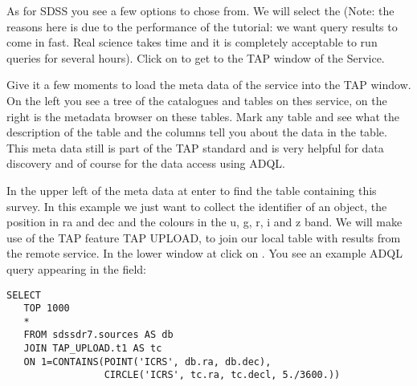 \documentclass[twoside]{article}[12pt]
\begin{document}
As for SDSS you see a few options to chose from. We will select the
 (Note: the reasons here is due to the performance
of the tutorial: we want query results to come in fast. Real science
takes time and it is completely acceptable to run queries for several hours).
Click on  to get to the TAP window of the Service. 

Give it a few moments to load the meta data of the service into the TAP
window. On the left you see a tree of the catalogues and tables on thes
service, on the right is the metadata browser on these tables. Mark any
table and see what the description of the table and the columns tell you
about the data in the table. This meta data still is part of the TAP
standard and is very helpful for data discovery and of course for the
data access using ADQL. 

In the upper left of the meta data at  enter  to
find the table containing this survey. In this example we just want to
collect the identifier of an object, the position in ra and dec and the
colours in the u, g, r, i and z band. We will make use of the TAP
feature TAP UPLOAD, to join our local table with results from the remote
service. In the lower window at 
click on  \goto {} \goto{}. You see an example
ADQL query appearing in the field:


\lstset{style=daiquiri, language=SQL}
\begin{lstlisting}
SELECT
   TOP 1000
   *
   FROM sdssdr7.sources AS db
   JOIN TAP_UPLOAD.t1 AS tc
   ON 1=CONTAINS(POINT('ICRS', db.ra, db.dec),
                 CIRCLE('ICRS', tc.ra, tc.decl, 5./3600.))
\end{lstlisting}
\end{document}
